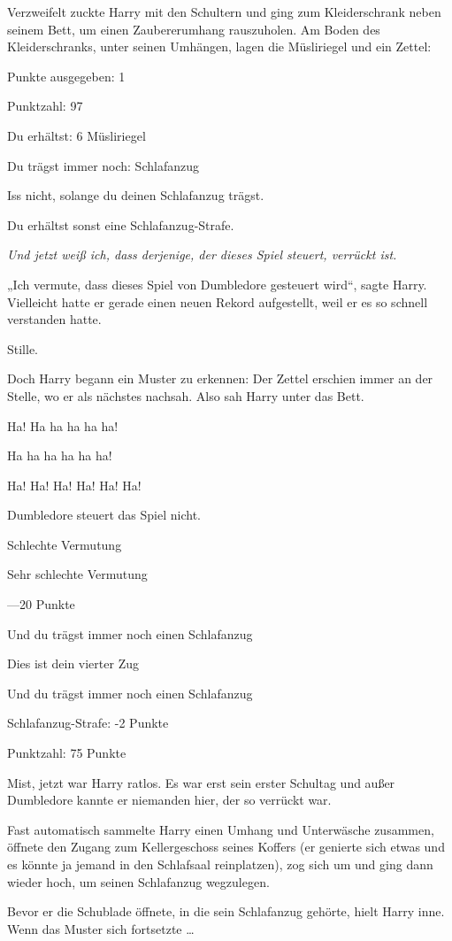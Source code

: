 {Verzweifelt zuckte Harry mit den Schultern und ging zum Kleiderschrank neben seinem Bett, um einen Zaubererumhang rauszuholen. Am Boden des Kleiderschranks, unter seinen Umhängen, lagen die Müsliriegel und ein Zettel:

Punkte ausgegeben: 1

Punktzahl: 97

Du erhältst: 6 Müsliriegel

Du trägst immer noch: Schlafanzug

Iss nicht, solange du deinen Schlafanzug trägst.

Du erhältst sonst eine Schlafanzug-Strafe.

\emph{Und jetzt weiß ich, dass derjenige, der dieses Spiel steuert, verrückt ist.}

„Ich vermute, dass dieses Spiel von Dumbledore gesteuert wird“, sagte Harry. Vielleicht hatte er gerade einen neuen Rekord aufgestellt, weil er es so schnell verstanden hatte.

Stille.

Doch Harry begann ein Muster zu erkennen: Der Zettel erschien immer an der Stelle, wo er als nächstes nachsah. Also sah Harry unter das Bett.

Ha! Ha ha ha ha ha!

Ha ha ha ha ha ha!

Ha! Ha! Ha! Ha! Ha! Ha!

Dumbledore steuert das Spiel nicht.

Schlechte Vermutung

Sehr schlechte Vermutung

—20 Punkte

Und du trägst immer noch einen Schlafanzug

Dies ist dein vierter Zug

Und du trägst immer noch einen Schlafanzug

Schlafanzug-Strafe: -2 Punkte

Punktzahl: 75 Punkte

Mist, jetzt war Harry ratlos. Es war erst sein erster Schultag und außer Dumbledore kannte er niemanden hier, der so verrückt war.

Fast automatisch sammelte Harry einen Umhang und Unterwäsche zusammen, öffnete den Zugang zum Kellergeschoss seines Koffers (er genierte sich etwas und es könnte ja jemand in den Schlafsaal reinplatzen), zog sich um und ging dann wieder hoch, um seinen Schlafanzug wegzulegen.

Bevor er die Schublade öffnete, in die sein Schlafanzug gehörte, hielt Harry inne. Wenn das Muster sich fortsetzte …

}
